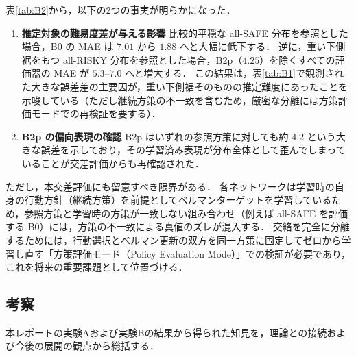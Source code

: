 \documentclass[a4paper,10pt]{jsarticle}
\theoremstyle{definition}
\begin{document}
表\ref{tab:B2}から，以下の2つの事実が明らかになった．
\begin{enumerate}
  \item \textbf{推定対象の難易度差が与える影響}\quad
  比較的平穏な all-SAFE 分布を参照とした場合，B0 の MAE は $7.01$ から $1.88$ へと大幅に低下する．
  逆に，重い下側裾をもつ all-RISKY 分布を参照とした場合，B2p（$4.25$）を除くすべての評価器の MAE が $5.3$--$7.0$ へと増大する．
  この結果は，表\ref{tab:B1}で観測された大きな誤差差の主要因が，重い下側裾そのものの推定難度にあったことを示唆している（ただし継続方策の不一致を含むため，厳密な分離には方策評価モードでの再検証を要する）．
  \item \textbf{B2p の偏向表現の確認}\quad
  B2p はいずれの参照方策に対しても約 $4.2$ という大きな誤差を示しており，その学習済み表現が分布全体として歪んでしまっていることが交差評価からも再確認された．
\end{enumerate}

ただし，本交差評価にも留意すべき限界がある．
各ネットワークは学習時の自身の行動方針（継続方策）を前提としてベルマンターゲットを学習しているため，参照方策と学習時の方策が一致しない組み合わせ（例えば all-SAFE を評価する B0）には，方策の不一致による真値のズレが混入する．
交絡を完全に分離するためには，行動選択とベルマン更新の双方を同一方策に固定してゼロから学習し直す「方策評価モード（Policy Evaluation Mode）」での検証が必要であり，これを将来の重要課題として位置づける．

\subsection{考察}
本レポートの実験Aおよび実験Bの結果から得られた知見を，理論との接続および今後の展開の観点から総括する．
\end{document}
